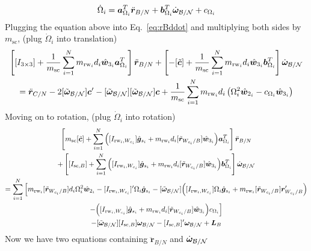 \documentclass[]{BasiliskReportMemo}
\begin{document}
\begin{equation}
\dot{\Omega}_i = \bm{a}_{\Omega_i}^T\ddot{\bm r}_{B/N} + \bm{b}_{\Omega_i}^T\dot{\bm\omega}_{\cal B/N} + c_{\Omega_i}
\end{equation}
Plugging the equation above into Eq.~\eqref{eq:rBddot} and multiplying both sides by $m_\text{sc}$, (plug $\dot{\Omega}_i$ into translation)
\begin{multline}
\left[ [I_{3\times3}] +\frac{1}{m_{\text{sc}}}\sum\limits_{i=1}^{N}m_{\text{rw}_i}d_i\hat{\bm{w}}_{3_i}\bm{a}_{\Omega_i}^T \right] \ddot{\bm r}_{B/N} +\left[ -[\tilde{\bm{c}}] + \frac{1}{m_{\text{sc}}}\sum\limits_{i=1}^{N}m_{\text{rw}_i}d_i\hat{\bm{w}}_{3_i}\bm{b}_{\Omega_i}^T \right] \dot{\bm\omega}_{\cal B/N} 
\\= \ddot{\bm r}_{C/N}   - 2[\tilde{\bm\omega}_{\cal B/N}]\bm{c}'-[\tilde{\bm\omega}_{\cal B/N}][\tilde{\bm\omega}_{\cal B/N}]\bm{c} + \frac{1}{m_{\text{sc}}}\sum\limits_{i=1}^{N}m_{\text{rw}_i}d_i\left(\Omega_i^2\hat{\bm{w}}_{2_i}-c_{\Omega_i}\hat{\bm{w}}_{3_i}\right)
\end{multline}
Moving on to rotation, (plug $\dot{\Omega}_i$ into rotation)
\begin{multline}
\left[ m_{\text{sc}}[\tilde{\bm c}]+ \sum\limits_{i=1}^{N}\Big([I_{\text{rw}_i,W_{c_i}}]\hat{\bm{g}}_{s_i} + m_{\text{rw}_i}d_i[\tilde{\bm{r}}_{W_{c_i}/B}]\hat{\bm{w}}_{3_i}\Big)\bm{a}_{\Omega_i}^T \right] \ddot{\bm r}_{B/N}
\\ 
+ \left[ [I_{\text{sc},B}] + \sum\limits_{i=1}^{N}\Big([I_{\text{rw}_i,W_{c_i}}]\hat{\bm{g}}_{s_i} + m_{\text{rw}_i}d_i[\tilde{\bm{r}}_{W_{c_i}/B}]\hat{\bm{w}}_{3_i}\Big)\bm{b}_{\Omega_i}^T \right] \dot{\bm\omega}_{\cal B/N} 
\\= 
\sum\limits_{i=1}^{N}\Big[ m_{\text{rw}_i}[\tilde{\bm{r}}_{W_{c_i}/B}]d_i \Omega_i^2\hat{\bm{w}}_{2_i}-[I_{\text{rw}_i,W_{c_i}}]'\Omega_i \hat{\bm{g}}_{s_i} -[\tilde{\bm\omega}_{\cal B/N}]\Big([I_{\text{rw}_i,W_{c_i}}]\Omega_i \hat{\bm{g}}_{s_i}+ m_{\text{rw}_i}[\tilde{\bm{r}}_{W_{c_i}/B}]\bm{r}'_{W_{c_i}/B}\Big) \\ 
-\Big([I_{\text{rw}_i,W_{c_i}}]\hat{\bm{g}}_{s_i} + m_{\text{rw}_i}d_i[\tilde{\bm{r}}_{W_{c_i}/B}]\hat{\bm{w}}_{3_i}\Big)c_{\Omega_i}\Big]
\\  -[\tilde{\bm\omega}_{\cal B/N}][I_{\text{sc},B}]\bm\omega_{\cal B/N}-  [I_{\text{sc},B}]'\bm\omega_{\cal B/N} + \bm{L}_B
\end{multline}
Now we have two equations containing $\ddot{\bm{r}}_{B/N}$ and $\dot{\bm\omega}_{\cal B/N}$
\end{document}
